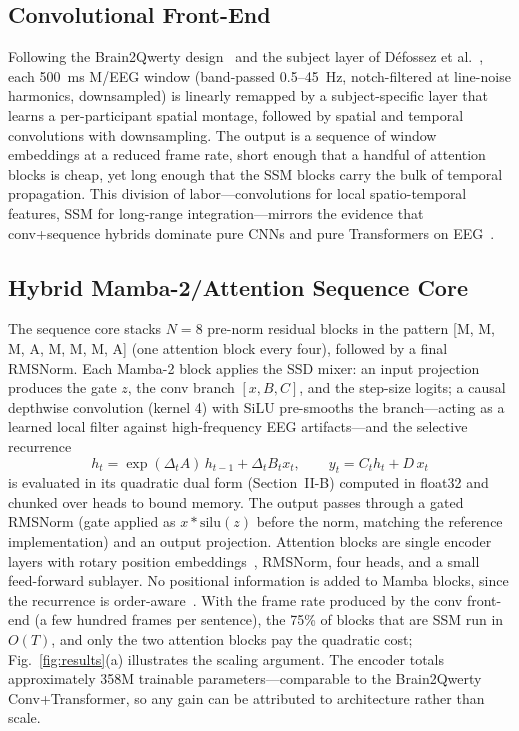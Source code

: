 \documentclass[conference]{IEEEtran}
\begin{document}
\subsection{Convolutional Front-End}
Following the Brain2Qwerty design~\cite{levy2025} and the subject layer of
D\'efossez et al.~\cite{defossez2023}, each 500~ms M/EEG window (band-passed
0.5--45~Hz, notch-filtered at line-noise harmonics, downsampled) is linearly
remapped by a subject-specific layer that learns a per-participant spatial
montage, followed by spatial and temporal convolutions with downsampling.
The output is a sequence of window embeddings at a reduced frame rate, short
enough that a handful of attention blocks is cheap, yet long enough that the
SSM blocks carry the bulk of temporal propagation. This division of
labor---convolutions for local spatio-temporal features, SSM for long-range
integration---mirrors the evidence that conv+sequence hybrids dominate pure
CNNs and pure Transformers on EEG~\cite{song2023conformer,ding2024deformer}.

\subsection{Hybrid Mamba-2/Attention Sequence Core}
The sequence core stacks $N=8$ pre-norm residual blocks in the pattern
[M, M, M, A, M, M, M, A] (one attention block every four), followed by a
final RMSNorm. Each Mamba-2 block applies the SSD mixer: an input projection
produces the gate $z$, the conv branch $[x, B, C]$, and the step-size
logits; a causal depthwise convolution (kernel 4) with SiLU pre-smooths the
branch---acting as a learned local filter against high-frequency EEG
artifacts---and the selective recurrence
\begin{equation}
h_t = \exp(\Delta_t A)\,h_{t-1} + \Delta_t B_t x_t, \qquad
y_t = C_t h_t + D\,x_t
\end{equation}
is evaluated in its quadratic dual form (Section~II-B) computed in float32
and chunked over heads to bound memory. The output passes through a gated
RMSNorm (gate applied as $x * \mathrm{silu}(z)$ before the norm, matching
the reference implementation) and an output projection. Attention blocks are
single encoder layers with rotary position embeddings~\cite{su2021roformer},
RMSNorm, four heads, and a small feed-forward sublayer. No positional
information is added to Mamba blocks, since the recurrence is
order-aware~\cite{lieber2024jamba}. With the frame rate produced by the conv
front-end (a few hundred frames per sentence), the 75\% of blocks that are
SSM run in $O(T)$, and only the two attention blocks pay the quadratic cost;
Fig.~\ref{fig:results}(a) illustrates the scaling argument. The encoder
totals approximately 358M trainable parameters---comparable to the
Brain2Qwerty Conv+Transformer, so any gain can be attributed to architecture
rather than scale.
\end{document}
